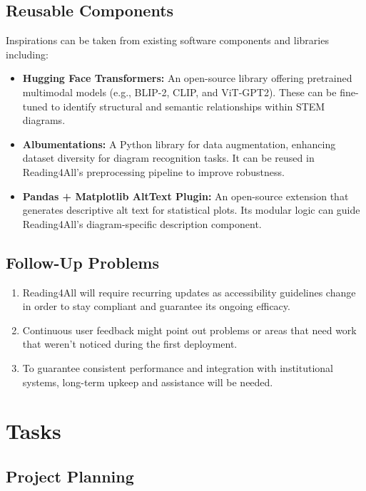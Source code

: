 \documentclass[12pt]{article}
\begin{document}
\subsection{Reusable Components}
Inspirations can be taken from existing software components and libraries including: 
\begin{itemize}
  \item \textbf{Hugging Face Transformers:} An open-source library
    offering pretrained multimodal models (e.g., BLIP-2, CLIP, and
    ViT-GPT2). These can be fine-tuned to identify structural and
    semantic relationships within STEM diagrams.

  \item \textbf{Albumentations:} A Python library for data
    augmentation, enhancing dataset diversity for diagram recognition
    tasks. It can be reused in Reading4All’s preprocessing pipeline
    to improve robustness.

  \item \textbf{Pandas + Matplotlib AltText Plugin:} An open-source
    extension that generates descriptive alt text for statistical
    plots. Its modular logic can guide Reading4All’s diagram-specific
    description component.
\end{itemize}

\subsection{Follow-Up Problems}

\begin{enumerate}
    \item Reading4All will require recurring updates as accessibility guidelines change in order to stay compliant and guarantee its ongoing efficacy.
    \item Continuous user feedback might point out problems or areas that need work that weren't noticed during the first deployment.
    \item To guarantee consistent performance and integration with institutional systems, long-term upkeep and assistance will be needed.
\end{enumerate}


\section{Tasks}

\subsection{Project Planning}
\end{document}
